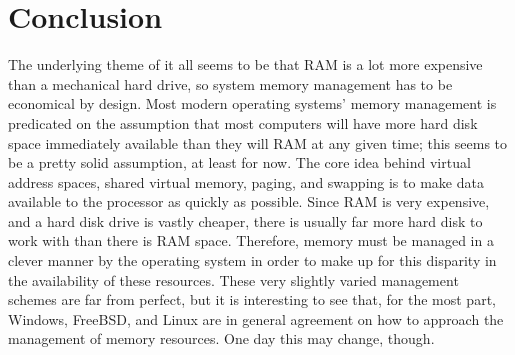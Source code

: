 \documentclass[letterpaper,10pt,draftclsnofoot,onecolumn]{IEEEtran}
\begin{document}
\section{Conclusion}
The underlying theme of it all seems to be that RAM is a lot more expensive than a mechanical hard drive, so system memory management has to be economical by design. Most modern operating systems’ memory management is predicated on the assumption that most computers will have more hard disk space immediately available than they will RAM at any given time; this seems to be a pretty solid assumption, at least for now. The core idea behind virtual address spaces, shared virtual memory, paging, and swapping is to make data available to the processor as quickly as possible. Since RAM is very expensive, and a hard disk drive is vastly cheaper, there is usually far more hard disk to work with than there is RAM space. Therefore, memory must be managed in a clever manner by the operating system in order to make up for this disparity in the availability of these resources. These very slightly varied management schemes are far from perfect, but it is interesting to see that, for the most part, Windows, FreeBSD, and Linux are in general agreement on how to approach the management of memory resources. One day this may change, though.



%

\newpage


\end{document}
